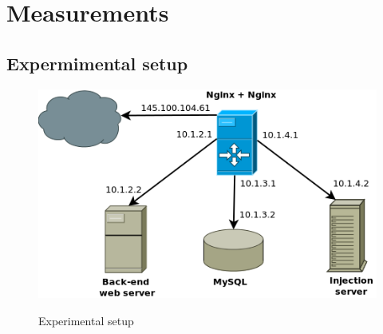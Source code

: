 \documentclass[Measurements]{subfiles}
\begin{document}
\section{Measurements}
\label{sec:Measurements}

\subsection{Expermimental setup}
\begin{figure}[h]
\caption{Experimental setup}
\centering
\includegraphics[scale=0.4] {images/infrastructure.png}
\label{fig:Experimental setup}
\end{figure}
\end{document}
